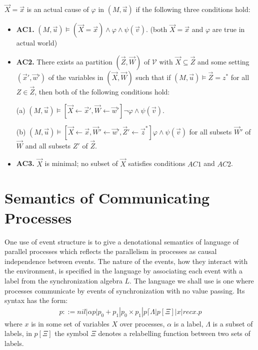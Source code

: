\documentclass{article}
\begin{document}
\begin{definition}
    $\vec X = \vec x$ is an actual cause of $\varphi$ in $(M,\vec u)$ if the following three conditions hold:
    \begin{itemize}
        \item  \textbf{AC1.} $(M,\vec u)\models (\vec X = \vec x) \wedge \varphi \wedge \psi(\vec v)$.
              (both $\vec X = \vec x$ and $\varphi$ are true in actual world)
        \item  \textbf{AC2. }There exists aa partition $(\vec Z, \vec W)$ of $\mathcal{V}$ with $\vec X \subseteq \vec Z$ and some setting $(\vec x',\vec w')$ of the variables in $(\vec X,\vec W)$ such that if $(M,\vec u)\models \vec Z = z^*$ for all $Z\in \vec Z$, then both of the following conditions hold:

              (a) $(M,\vec u)\models[\vec X \leftarrow \vec x', \vec W \leftarrow \vec w']\neg \varphi \wedge \psi(\vec v)$.

              (b) $(M,\vec u)\models[\vec X\leftarrow \vec x, \vec W' \leftarrow \vec w', \vec Z'\leftarrow \vec z^*]\varphi \wedge \psi(\vec v)$ for all subsets $\vec W'$ of $\vec W$ and all subsets $Z'$ of $\vec Z$.

        \item  \textbf{AC3.} $\vec X$ is minimal; no subset of $\vec X$ satisfies conditions $AC1$ and $AC2$.
    \end{itemize}
\end{definition}

\section{Semantics of Communicating Processes}
One use of event structure is to give a denotational semantics of language of parallel
processes which reflects the parallelism in processes as causal independence between events.
The nature of the events, how they interact with the environment,
is specified in the language by associating each event with a label from the synchronization
algebra $L$.
The language we shall use is one where processes communicate by events of synchronization
with no value passing.
Its syntax has the form:
\begin{align*}
    p ::= nil | \alpha p | p_0 + p_1 | p_0 \times p_1 | p\lceil \Lambda | p[\Xi] | x | recx.p
\end{align*}
where $x$ is in some set of variables $X$ over processes, $\alpha$ is a label,
$\Lambda$ is a subset of labels, in $p[\Xi]$ the symbol $\Xi$ denotes a relabelling function between
two sets of labels.
\end{document}
